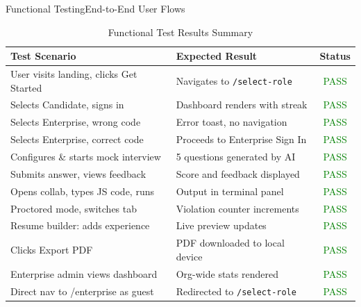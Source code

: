 \documentclass{beamer}
\begin{document}
\begin{frame}{Functional Testing}{End-to-End User Flows}
\scriptsize
\begin{table}
\centering
\begin{tabular}{|p{4.5cm}|p{3.5cm}|c|}
\hline
\textbf{Test Scenario} & \textbf{Expected Result} & \textbf{Status} \\ \hline
User visits landing, clicks Get Started & Navigates to \texttt{/select-role} & \textcolor{green}{PASS} \\ \hline
Selects Candidate, signs in & Dashboard renders with streak & \textcolor{green}{PASS} \\ \hline
Selects Enterprise, wrong code & Error toast, no navigation & \textcolor{green}{PASS} \\ \hline
Selects Enterprise, correct code & Proceeds to Enterprise Sign In & \textcolor{green}{PASS} \\ \hline
Configures \& starts mock interview & 5 questions generated by AI & \textcolor{green}{PASS} \\ \hline
Submits answer, views feedback & Score and feedback displayed & \textcolor{green}{PASS} \\ \hline
Opens collab, types JS code, runs & Output in terminal panel & \textcolor{green}{PASS} \\ \hline
Proctored mode, switches tab & Violation counter increments & \textcolor{green}{PASS} \\ \hline
Resume builder: adds experience & Live preview updates & \textcolor{green}{PASS} \\ \hline
Clicks Export PDF & PDF downloaded to local device & \textcolor{green}{PASS} \\ \hline
Enterprise admin views dashboard & Org-wide stats rendered & \textcolor{green}{PASS} \\ \hline
Direct nav to /enterprise as guest & Redirected to \texttt{/select-role} & \textcolor{green}{PASS} \\ \hline
\end{tabular}
\caption{Functional Test Results Summary}
\end{table}
\end{frame}
\end{document}
